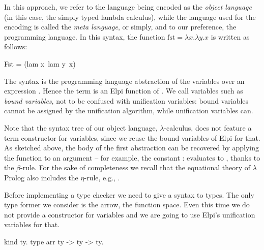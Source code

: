 \documentclass{these-ISSS}
\newenvironment{elpicode}
  {\VerbatimEnvironment\begin{elpibox}\begin{xelpicode}}{\end{xelpicode}
\end{elpibox}}
\begin{document}
In this approach, we refer to the language being
encoded as the \emph{object language} (in this case, the simply typed lambda
calculus), while the language used for the encoding is called the \emph{meta language},
or simply, and to our preference, the programming language.
In this syntax, the function $\mathrm{fst} = \lambda x.\lambda y.x$ is written as
follows:

\begin{elpicode}
Fst = (lam x\ lam y\ x)
\end{elpicode}
The syntax  is the programming language abstraction of the
variables  over an expression . Hence
the term  is an Elpi function of .
We call variables such as  \emph{bound variables}, not to be
confused with unification variables: bound variables cannot be assigned by
the unification algorithm, while unification variables can.

Note that
the syntax tree of our object language,
$\lambda$-calculus, does not feature a term constructor for variables, since
we reuse the bound variables of Elpi for that. As sketched above, the body of the first
abstraction can be recovered by applying the function to an argument -- for
example, the constant :  evaluates to
, thanks to the $\beta$-rule. For the sake of
completeness we recall that the equational theory of $\lambda$Prolog
also includes the $\eta$-rule, e.g., .


Before implementing a type checker we need to give a syntax to types.
The only type former we consider is the arrow, the function space.
Even this time we do not provide a constructor for variables and we
are going to use Elpi's unification variables for that.

\begin{elpicode}
kind ty.
type arr ty -> ty -> ty.
\end{elpicode}
\end{document}
